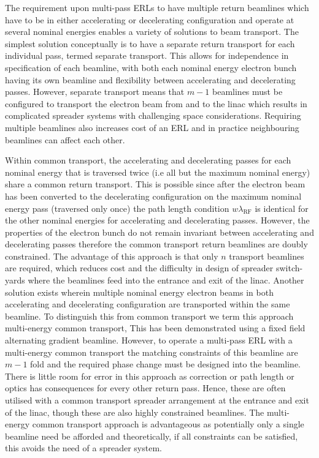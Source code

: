 \documentclass[../main.tex]{subfiles}
\begin{document}
The requirement upon multi-pass ERLs to have multiple return beamlines which have to be in either accelerating or decelerating configuration and operate at several nominal energies enables a variety of solutions to beam transport. The simplest solution conceptually is to have a separate return transport for each individual pass, termed separate transport. This allows for independence in specification of each beamline, with both each nominal energy electron bunch having its own beamline and flexibility between accelerating and decelerating passes. However, separate transport means that $m-1$ beamlines must be configured to transport the electron beam from and to the linac which results in complicated spreader systems with challenging space considerations. Requiring multiple beamlines also increases cost of an ERL and in practice neighbouring beamlines can affect each other.

Within common transport, the accelerating and decelerating passes for each nominal energy that is traversed twice (i.e all but the maximum nominal energy) share a common return transport. This is possible since after the electron beam has been converted to the decelerating configuration on the maximum nominal energy pass (traversed only once) the path length condition $w\lambda_{\mathrm{RF}}$ is identical for the other nominal energies for accelerating and decelerating passes. However, the properties of the electron bunch do not remain invariant between accelerating and decelerating passes therefore the common transport return beamlines are doubly constrained. The advantage of this approach is that only $n$ transport beamlines are required, which reduces cost and the difficulty in design of spreader switch-yards where the beamlines feed into the entrance and exit of the linac.   
Another solution exists wherein multiple nominal energy electron beams in both accelerating and decelerating configuration are transported within the same beamline. To distinguish this from common transport we term this approach multi-energy common transport, This has been demonstrated \cite{bartnik2020cbeta} using a fixed field alternating gradient beamline. However, to operate a multi-pass ERL with a multi-energy common transport the matching constraints of this beamline are $m-1$ fold and the required phase change must be designed into the beamline. There is little room for error in this approach as correction or path length or optics has consequences for every other return pass. Hence, these are often utilised with a common transport spreader arrangement at the entrance and exit of the linac, though these are also highly constrained beamlines. The multi-energy common transport approach is advantageous as potentially only a single beamline need be afforded and theoretically, if all constraints can be satisfied, this avoids the need of a spreader system.  
\end{document}
